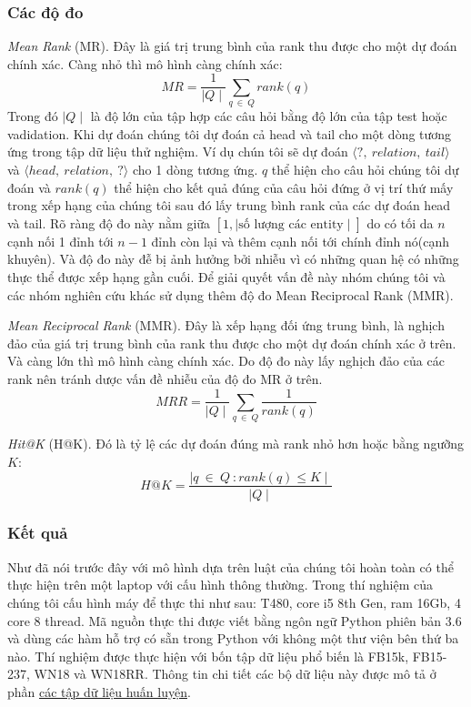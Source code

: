 \subsubsection{Các độ đo}
\textit{Mean Rank} (MR). Đây là giá trị trung bình của rank thu được cho một dự đoán chính xác. Càng nhỏ thì mô hình càng chính xác:
\[MR = \frac{1}{\mid Q \mid} \sum_{q ~\in~ Q} rank(q) \]
Trong đó \(\mid Q \mid\) là độ lớn của tập hợp các câu hỏi bằng độ lớn của tập test hoặc vadidation. Khi dự đoán chúng tôi dự đoán cả head và tail cho một dòng tương ứng trong tập dữ liệu thử nghiệm. Ví dụ chún tôi sẽ dự đoán \(\langle ?,~ relation,~ tail \rangle\) và \(\langle head,~ relation,~ ?\rangle\) cho 1 dòng tương ứng. \(q\) thể hiện cho câu hỏi chúng tôi dự đoán và \(rank(q)\) thể hiện cho kết quả đúng của câu hỏi đứng ở vị trí thứ mấy trong xếp hạng của chúng tôi sau đó lấy trung bình rank của các dự đoán head và tail. Rõ ràng độ đo này nằm giữa \([1, \mid \text{số lượng các entity} \mid]\) do có tối da \(n\) cạnh nối 1 đỉnh tới \(n-1\) đỉnh còn lại và thêm cạnh nối tới chính đỉnh nó(cạnh khuyên). Và độ đo này đễ bị ảnh hưởng bởi nhiễu vì có những quan hệ có những thực thể được xếp hạng gần cuối. Để giải quyết vấn đề này nhóm chúng tôi và các nhóm nghiên cứu khác sử dụng thêm độ đo Mean Reciprocal Rank (MMR).

\textit{Mean Reciprocal Rank} (MMR). Đây là xếp hạng đối ứng trung bình, là nghịch đảo của giá trị trung bình của rank thu được cho một dự đoán chính xác ở trên. Và càng lớn thì mô hình càng chính xác. Do độ đo này lấy nghịch đảo của các rank nên tránh dược vấn đề nhiễu của độ đo MR ở trên.
\[MRR =\frac{1}{\mid Q \mid} \sum_{q~ \in ~Q} \frac{1}{rank(q)}\]

\textit{Hit@K} (H@K). Đó là tỷ lệ các dự đoán đúng mà rank nhỏ hơn hoặc bằng ngưỡng \(K\):
\[H@K = \frac{\mid {q ~\in ~Q~: rank(q) \leq K} \mid}{\mid Q \mid}\]
\subsubsection{Kết quả}
Như đã nói trước đây với mô hình dựa trên luật của chúng tôi hoàn toàn có thể thực hiện trên một laptop với cấu hình thông thường. Trong thí nghiệm của chúng tôi cấu hình máy để thực thi như sau: T480, core i5 8th Gen, ram 16Gb, 4 core 8 thread. Mã nguồn thực thi được viết bằng ngôn ngữ Python phiên bản 3.6 và dùng các hàm hỗ trợ có sẵn trong Python với không một thư viện bên thứ ba nào. Thí nghiệm được thực hiện với bốn tập dữ liệu phổ biến là FB15k, FB15-237, WN18 và WN18RR. Thông tin chi tiết các bộ dữ liệu này được mô tả ở phần \hyperref[datasets]{các tập dữ liệu huấn luyện}.

